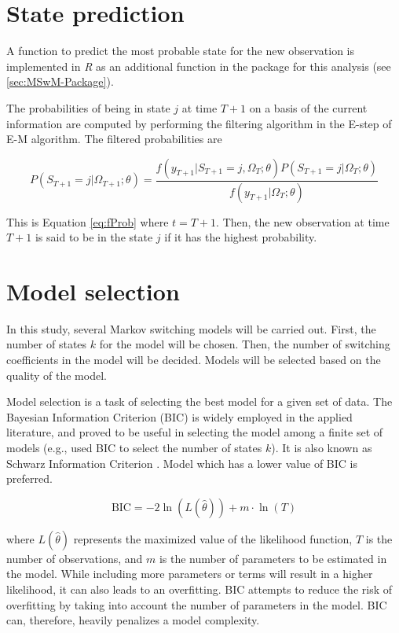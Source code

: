 \section{State prediction}

A function to predict the most probable state for the new observation
is implemented in \emph{R} as an additional function in the package
for this analysis (see \ref{sec:MSwM-Package}).

The probabilities of being in state $j$ at time $T+1$ on a basis
of the current information are computed by performing the filtering
algorithm in the E-step of E-M algorithm. The filtered probabilities
are

\[
P(S_{T+1}=j|\Omega_{T+1};\theta)=\frac{f(y_{T+1}|S_{T+1}=j,\Omega_{T};\theta)P(S_{T+1}=j|\Omega_{T};\theta)}{f(y_{T+1}|\Omega_{T};\theta)}
\]

This is Equation \ref{eq:fProb} where $t=T+1$. Then, the new observation
at time $T+1$ is said to be in the state $j$ if it has the highest
probability.

\section{Model selection}

In this study, several Markov switching models will be carried out.
First, the number of states $k$ for the model will be chosen. Then,
the number of switching coefficients in the model will be decided.
Models will be selected based on the quality of the model. 

Model selection is a task of selecting the best model for a given
set of data. The Bayesian Information Criterion (BIC) is widely employed
in the applied literature, and proved to be useful in selecting the
model among a finite set of models (e.g., \citet{leroux1992maximum}
used BIC to select the number of states $k$). It is also known as
Schwarz Information Criterion \citep{schwarz1978estimating}. Model
which has a lower value of BIC is preferred. 

\[
\mathrm{BIC}=-2\ln(L(\hat{\theta}))+m\cdot\ln(T)
\]

where $L(\hat{\theta})$ represents the maximized value of the likelihood
function, $T$ is the number of observations, and $m$ is the number
of parameters to be estimated in the model. While including more parameters
or terms will result in a higher likelihood, it can also leads to
an overfitting. BIC attempts to reduce the risk of overfitting by
taking into account the number of parameters in the model. BIC can,
therefore, heavily penalizes a model complexity. %

